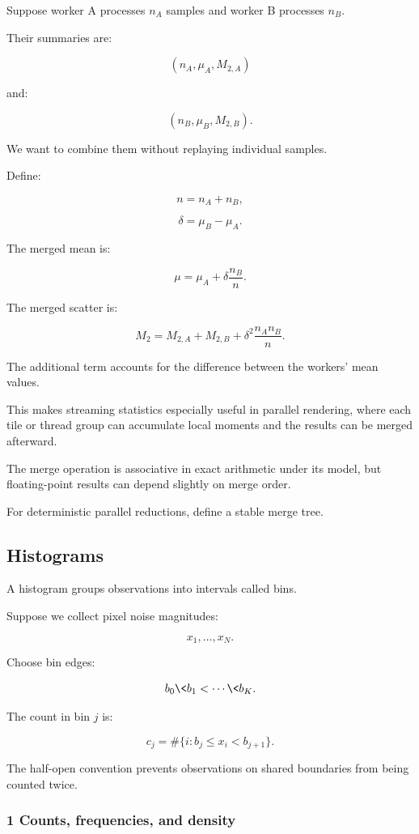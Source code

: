 Suppose worker A processes \(n_A\) samples and worker B processes \(n_B\).

Their summaries are:

\[
 (n_A,\mu_A,M_{2,A})
\]

and:

\[
 (n_B,\mu_B,M_{2,B}).
\]

We want to combine them without replaying individual samples.

Define:

\[
 n=n_A+n_B,
\]

\[
 \delta=\mu_B-\mu_A.
\]

The merged mean is:

\[
 \boxed{ \mu= \mu_A+\delta\frac{n_B}{n} }.
\]

The merged scatter is:

\[
 \boxed{ M_2= M_{2,A}+M_{2,B} + \delta^2\frac{n_An_B}{n} }.
\]

The additional term accounts for the difference between the workers' mean values.

This makes streaming statistics especially useful in parallel rendering, where each tile or thread group can accumulate local moments and the results can be merged afterward.

The merge operation is associative in exact arithmetic under its model, but floating-point results can depend slightly on merge order.

For deterministic parallel reductions, define a stable merge tree.

\subsection{Histograms}\label{02-foundations-ii-ch030-histograms}

A histogram groups observations into intervals called bins.

Suppose we collect pixel noise magnitudes:

\[
 x_1,\ldots,x_N.
\]

Choose bin edges:

\[
 b_0\<b_1<\cdots\<b_K.
\]

The count in bin \(j\) is:

\[
 \boxed{ c_j= \#\{i:b_j\le x_i < b_{j+1}\} }.
\]

The half-open convention prevents observations on shared boundaries from being counted twice.

\subsubsection{1 Counts, frequencies, and density}\label{02-foundations-ii-ch030-counts-frequencies-and-density}

